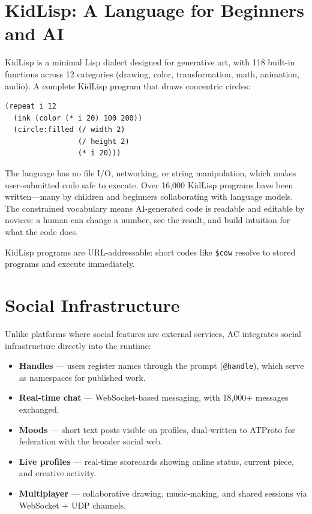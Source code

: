 \documentclass[manuscript,anonymous,review]{acmart}
\begin{document}
\section{KidLisp: A Language for Beginners and AI}

KidLisp is a minimal Lisp dialect designed for generative art, with 118 built-in functions across 12 categories (drawing, color, transformation, math, animation, audio). A complete KidLisp program that draws concentric circles:

\begin{lstlisting}
(repeat i 12
  (ink (color (* i 20) 100 200))
  (circle:filled (/ width 2)
                 (/ height 2)
                 (* i 20)))
\end{lstlisting}

The language has no file I/O, networking, or string manipulation, which makes user-submitted code safe to execute. Over 16,000 KidLisp programs have been written---many by children and beginners collaborating with language models. The constrained vocabulary means AI-generated code is readable and editable by novices: a human can change a number, see the result, and build intuition for what the code does.

KidLisp programs are URL-addressable: short codes like \texttt{\$cow} resolve to stored programs and execute immediately.

\section{Social Infrastructure}

Unlike platforms where social features are external services, AC integrates social infrastructure directly into the runtime:

\begin{itemize}
  \item \textbf{Handles} --- users register names through the prompt (\texttt{@handle}), which serve as namespaces for published work.
  \item \textbf{Real-time chat} --- WebSocket-based messaging, with 18,000+ messages exchanged.
  \item \textbf{Moods} --- short text posts visible on profiles, dual-written to ATProto for federation with the broader social web.
  \item \textbf{Live profiles} --- real-time scorecards showing online status, current piece, and creative activity.
  \item \textbf{Multiplayer} --- collaborative drawing, music-making, and shared sessions via WebSocket + UDP channels.
\end{itemize}
\end{document}
